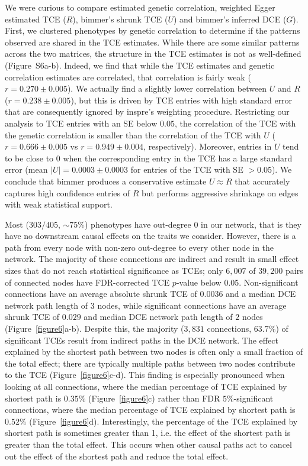\documentclass{article}
\begin{document}
We were curious to compare estimated
genetic correlation, weighted Egger estimated TCE ($R$), bimmer's
shrunk TCE ($U$) and bimmer's inferred DCE ($G$). First, we clustered phenotypes by genetic correlation
to determine if the patterns observed are shared in the TCE estimates.
While there are some similar patterns across the two matrices, the structure in the TCE estimates
is not as well-defined (Figure~S6a-b).
Indeed, we find that while the TCE estimates
and genetic correlation estimates are correlated, that correlation is fairly
weak ($r = 0.270\pm 0.005$). We actually find a slightly lower correlation between
 $U$ and $R$ ($r = 0.238 \pm 0.005$), but this is driven by TCE entries with high 
standard error that are consequently ignored by inspre's weighting procedure.
Restricting our analysis to TCE entries with an
SE below $0.05$, the correlation of the TCE with the genetic correlation is smaller
than the correlation of the TCE with $U$ ($r = 0.666 \pm 0.005$ vs $r = 0.949 \pm 0.004$, respectively).
Moreover, entries in $U$ tend to be close to $0$ when the corresponding
entry in the TCE has a large standard error (mean ${|U|} = 0.0003 \pm 0.0003$ for entries of
the TCE with SE $> 0.05$). We conclude that bimmer produces a conservative
estimate $U \approx R$ that accurately captures high confidence
entries of $R$ but performs aggressive shrinkage on edges with weak statistical support. 

Most ($303/405$, $\sim 75\%$) phenotypes have out-degree $0$ in our network, that is they have no
downstream causal effects on the traits we consider. However, there is a path from every node with non-zero
out-degree to every other node in the network. The majority of these connections
are indirect and result in small effect sizes that do not reach
statistical significance as TCEs; only
$6,007$ of $39,200$ pairs of connected nodes have FDR-corrected TCE $p$-value below 0.05.
Non-significant connections have an average absolute shrunk TCE of $0.0036$
and a median DCE network path length of $3$ nodes, while
significant connections have an average shrunk TCE of $0.029$ and median DCE network path length of $2$ nodes
(Figure~\ref{figure6}a-b). Despite this, the majority
 ($3,831$ connections, $63.7\%$) of significant TCEs result from indirect paths in the DCE network.
The effect explained by the shortest path between two nodes is often only a small
fraction of the total effect; there are typically multiple paths
between two nodes contribute to the TCE (Figure~\ref{figure6}c-d). This finding is especially pronounced 
when looking at all connections, where  the median percentage of TCE explained
by shortest path is $0.35\%$ (Figure~\ref{figure6}c) rather than FDR $5\%$-significant connections,
where the  median percentage of TCE explained
by shortest path is $0.52\%$ (Figure~\ref{figure6}d).
Interestingly, the percentage of the TCE explained
by shortest path is sometimes greater than 1, i.e. the
effect of the shortest path is greater than the total effect. This occurs
when other causal paths act to cancel out the effect of the shortest path and reduce the total effect.
\end{document}
